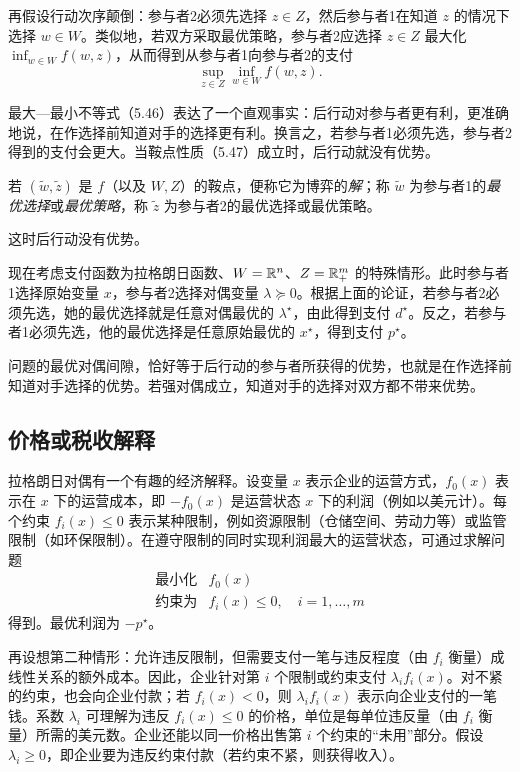 再假设行动次序颠倒：参与者2必须先选择 $z\in Z$，然后参与者1在知道 $z$ 的情况下选择 $w\in W$。类似地，若双方采取最优策略，参与者2应选择 $z\in Z$ 最大化 $\inf_{w\in W}f(w,z)$，从而得到从参与者1向参与者2的支付
\[
\sup_{z\in Z}\inf_{w\in W}f(w,z).
\]

最大—最小不等式（5.46）表达了一个直观事实：后行动对参与者更有利，更准确地说，在作选择前知道对手的选择更有利。换言之，若参与者1必须先选，参与者2得到的支付会更大。当鞍点性质（5.47）成立时，后行动就没有优势。

若 $(\widetilde w,\widetilde z)$ 是 $f$（以及 $W,Z$）的鞍点，便称它为博弈的\emph{解}；称 $\widetilde w$ 为参与者1的\emph{最优选择}或\emph{最优策略}，称 $\widetilde z$ 为参与者2的最优选择或最优策略。

这时后行动没有优势。

现在考虑支付函数为拉格朗日函数、$W=\mathbb R^n$、$Z=\mathbb R_+^m$ 的特殊情形。此时参与者1选择原始变量 $x$，参与者2选择对偶变量 $\lambda\succeq0$。根据上面的论证，若参与者2必须先选，她的最优选择就是任意对偶最优的 $\lambda^\star$，由此得到支付 $d^\star$。反之，若参与者1必须先选，他的最优选择是任意原始最优的 $x^\star$，得到支付 $p^\star$。

问题的最优对偶间隙，恰好等于后行动的参与者所获得的优势，也就是在作选择前知道对手选择的优势。若强对偶成立，知道对手的选择对双方都不带来优势。

\subsection{价格或税收解释}
拉格朗日对偶有一个有趣的经济解释。设变量 $x$ 表示企业的运营方式，$f_0(x)$ 表示在 $x$ 下的运营成本，即 $-f_0(x)$ 是运营状态 $x$ 下的利润（例如以美元计）。每个约束 $f_i(x)\le0$ 表示某种限制，例如资源限制（仓储空间、劳动力等）或监管限制（如环保限制）。在遵守限制的同时实现利润最大的运营状态，可通过求解问题
\[
\begin{array}{ll}\text{最小化}&f_0(x)\\
\text{约束为}&f_i(x)\le0,\quad i=1,\ldots,m\end{array}
\]
得到。最优利润为 $-p^\star$。

再设想第二种情形：允许违反限制，但需要支付一笔与违反程度（由 $f_i$ 衡量）成线性关系的额外成本。因此，企业针对第 $i$ 个限制或约束支付 $\lambda_i f_i(x)$。对不紧的约束，也会向企业付款；若 $f_i(x)<0$，则 $\lambda_i f_i(x)$ 表示向企业支付的一笔钱。系数 $\lambda_i$ 可理解为违反 $f_i(x)\le0$ 的价格，单位是每单位违反量（由 $f_i$ 衡量）所需的美元数。企业还能以同一价格出售第 $i$ 个约束的“未用”部分。假设 $\lambda_i\ge0$，即企业要为违反约束付款（若约束不紧，则获得收入）。

